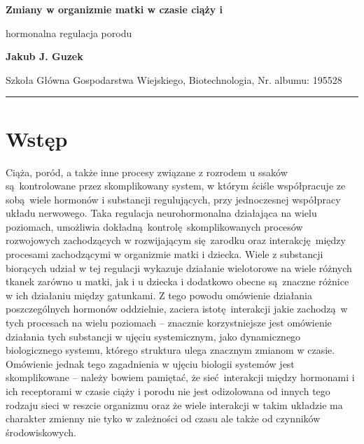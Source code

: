 \documentclass[two column, twoside, a4paper]{article}
\begin{document}
\begin{strip}
{\sc \bfseries \huge {}\selectfont Zmiany w organizmie matki w czasie ciąży i

\vspace{2pt} hormonalna regulacja porodu} \vspace{\baselineskip}

{\bfseries \Large Jakub J. Guzek}

{Szkoła Główna Gospodarstwa Wiejskiego, Biotechnologia, Nr. albumu: 195528}\vspace{\baselineskip}

\hrule
\end{strip}

\section{Wstęp}

Ciąża, poród, a także inne procesy związane z rozrodem u ssaków są kontrolowane przez skomplikowany system, w którym ściśle współpracuje ze sobą wiele hormonów i substancji regulujących, przy jednoczesnej współpracy układu nerwowego. Taka regulacja neurohormonalna działająca na wielu poziomach, umożliwia dokładną kontrolę skomplikowanych procesów rozwojowych zachodzących w rozwijającym się zarodku oraz interakcję między procesami zachodzącymi w organizmie matki i dziecka. Wiele z substancji biorących udział w tej regulacji wykazuje działanie wielotorowe na wiele różnych tkanek zarówno u matki, jak i u dziecka i dodatkowo obecne są znaczne różnice w ich działaniu między gatunkami.
Z tego powodu omówienie działania poszczególnych hormonów oddzielnie, zaciera istotę interakcji jakie zachodzą w tych procesach na wielu poziomach -- znacznie korzystniejsze jest omówienie działania tych substancji w ujęciu systemicznym, jako dynamicznego biologicznego systemu, którego struktura ulega znacznym zmianom w czasie. Omówienie jednak tego zagadnienia w ujęciu biologii systemów jest skomplikowane -- należy bowiem pamiętać, że sieć interakcji między hormonami i ich receptorami w czasie ciąży i porodu nie jest odizolowana od innych tego rodzaju sieci w reszcie organizmu oraz że wiele interakcji w takim układzie ma charakter zmienny nie tyko w zależności od czasu ale także od czynników środowiskowych.
\end{document}

